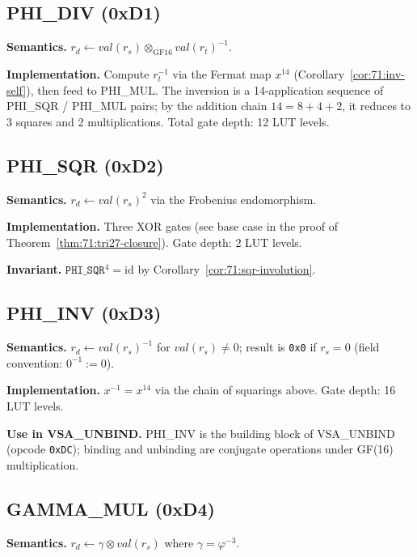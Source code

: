 \subsection{PHI\_DIV (0xD1)}
\label{subsec:71:phi-div}

\textbf{Semantics.} $r_d \leftarrow \mathit{val}(r_s) \otimes_{\mathrm{GF}16} \mathit{val}(r_t)^{-1}$.

\textbf{Implementation.} Compute $r_t^{-1}$ via the Fermat map
$x^{14}$ (Corollary~\ref{cor:71:inv-self}), then feed to PHI\_MUL.
The inversion is a 14-application sequence of PHI\_SQR / PHI\_MUL
pairs; by the addition chain $14 = 8 + 4 + 2$, it reduces to
3 squares and 2 multiplications.  Total gate depth: 12 LUT levels.

\subsection{PHI\_SQR (0xD2)}
\label{subsec:71:phi-sqr}

\textbf{Semantics.} $r_d \leftarrow \mathit{val}(r_s)^2$ via the
Frobenius endomorphism.

\textbf{Implementation.} Three XOR gates (see base case in the proof
of Theorem~\ref{thm:71:tri27-closure}).  Gate depth: 2 LUT levels.

\textbf{Invariant.} $\mathtt{PHI\_SQR}^4 = \mathrm{id}$ by
Corollary~\ref{cor:71:sqr-involution}.

\subsection{PHI\_INV (0xD3)}
\label{subsec:71:phi-inv}

\textbf{Semantics.} $r_d \leftarrow \mathit{val}(r_s)^{-1}$ for
$\mathit{val}(r_s) \ne 0$; result is \texttt{0x0} if $r_s = 0$
(field convention: $0^{-1} := 0$).

\textbf{Implementation.} $x^{-1} = x^{14}$ via the chain of squarings
above.  Gate depth: 16 LUT levels.

\textbf{Use in VSA\_UNBIND.} PHI\_INV is the building block of
VSA\_UNBIND (opcode \texttt{0xDC}); binding and unbinding are
conjugate operations under GF(16) multiplication.

\subsection{GAMMA\_MUL (0xD4)}
\label{subsec:71:gamma-mul}

\textbf{Semantics.} $r_d \leftarrow \gamma \otimes \mathit{val}(r_s)$
where $\gamma = \varphi^{-3}$.

